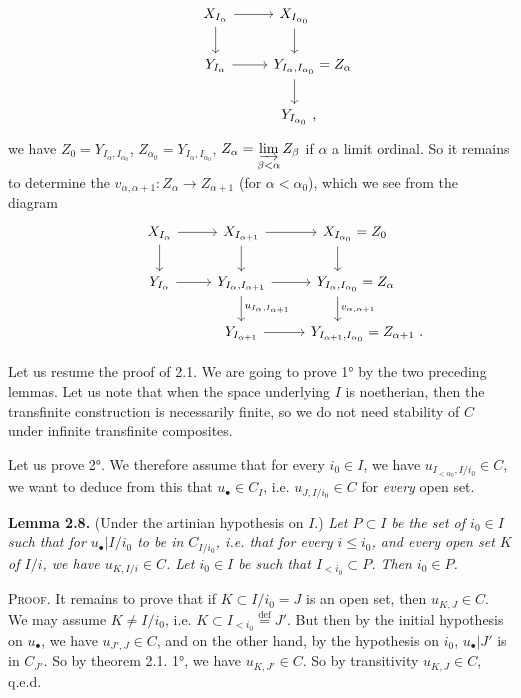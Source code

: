 \documentclass[11pt]{article}
\newcommand{\printedpage}[1]{\marginpar{\footnotesize p.~#1}}
\newcommand{\msp}[1]{\marginpar{\footnotesize [#1]}}
\begin{document}
\printedpage{19}

\[
\begin{tikzcd}
X_{I_\alpha} \arrow[r] \arrow[d] & X_{I_{\alpha_0}} \arrow[d] \\
Y_{I_\alpha} \arrow[r] & Y_{I_\alpha,I_{\alpha_0}} \rlap{${}= Z_\alpha$} \arrow[d] \\
& Y_{I_{\alpha_0}} \rlap{\ ,}
\end{tikzcd}
\]
we have $Z_0 = Y_{I_\alpha,I_{\alpha_0}}$, $Z_{\alpha_0} = Y_{I_\alpha,I_{\alpha_0}}$, $Z_\alpha = \varinjlim\limits_{\beta<\alpha} Z_\beta$ if $\alpha$ \msp{34} a limit ordinal. So it remains to determine the $v_{\alpha,\alpha+1} : Z_\alpha \longrightarrow Z_{\alpha+1}$ (for $\alpha < \alpha_0$), which we see from the diagram
\[
\begin{tikzcd}
X_{I_\alpha} \arrow[r] \arrow[d] & X_{I_{\alpha+1}} \arrow[r] \arrow[d] & X_{I_{\alpha_0}} \rlap{${}= Z_0$} \arrow[d] \\
Y_{I_\alpha} \arrow[r] & Y_{I_\alpha,I_{\alpha+1}} \arrow[r] \arrow[d, "u_{I_\alpha,I_{\alpha+1}}"] & Y_{I_\alpha,I_{\alpha_0}} \rlap{${}= Z_\alpha$} \arrow[d, "v_{\alpha,\alpha+1}"] \\
& Y_{I_{\alpha+1}} \arrow[r] & Y_{I_{\alpha+1},I_{\alpha_0}} \rlap{${}= Z_{\alpha+1}\ .$}
\end{tikzcd}
\]

Let us resume the proof of 2.1. We are going to prove 1° by the two preceding lemmas. Let us note that when the space underlying $I$ is noetherian, then the transfinite construction is necessarily finite, so we do not need stability of $C$ under infinite transfinite composites.

\msp{35}

Let us prove 2°. We therefore assume that for every $i_0 \in I$, we have $u_{I_{<\alpha_0},I/i_0} \in C$, we want to deduce from this that $u_\bullet \in C_I$, i.e. $u_{J,I/i_0} \in C$ for \textit{every} open set.

\noindent\textbf{Lemma 2.8.} (Under the artinian hypothesis on $I$.) \textit{Let $P \subset I$ be the set of $i_0 \in I$ such that for $u_\bullet|I/i_0$ to be in $C_{I/i_0}$, i.e. that for every $i \leq i_0$, and every open set $K$ of $I/i$, we have $u_{K,I/i} \in C$. Let $i_0 \in I$ be such that $I_{<i_0} \subset P$. Then $i_0 \in P$.}

\noindent\textsc{Proof}. It remains to prove that if $K \subset I/i_0 = J$ is an open set, then $u_{K,J} \in C$. We may assume $K \neq I/i_0$, i.e. $K \subset I_{<i_0} \overset{\text{def}}{=} J'$. But then by the initial hypothesis on $u_\bullet$, we have $u_{J',J} \in C$, and on the other hand, by the hypothesis on $i_0$, $u_\bullet|J'$ is in $C_{J'}$. So by theorem 2.1. 1°, we have $u_{K,J'} \in C$. So by transitivity $u_{K,J} \in C$, q.e.d.
\end{document}
